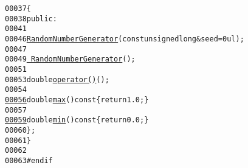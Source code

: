 \begin{footnotesize}
\begin{alltt}
00037     \{
00038         \textcolor{keyword}{public}:
00041 
00046             \hyperlink{classeos_1_1RandomNumberGenerator_a661f2b9c129ddd7a1c23f463ef4ec5b7}{RandomNumberGenerator}(\textcolor{keyword}{const} \textcolor{keywordtype}{unsigned} \textcolor{keywordtype}{long} & seed = 0ul);
00047 
00049             \hyperlink{classeos_1_1RandomNumberGenerator_a379d4e110cdf0ded2e930e2e7ffa59a1}{~RandomNumberGenerator}();
00051 
00053             \textcolor{keywordtype}{double} \hyperlink{classeos_1_1RandomNumberGenerator_ac81a62bb3e4534fcfb0d15195ee653b0}{operator() }();
00054 
\hypertarget{random__number__generator_8hh_source_l00056}{}\hyperlink{classeos_1_1RandomNumberGenerator_adac254d76323261e06d42b2f48e05c50}{00056}             \textcolor{keywordtype}{double} \hyperlink{classeos_1_1RandomNumberGenerator_adac254d76323261e06d42b2f48e05c50}{max}()\textcolor{keyword}{ const }\{ \textcolor{keywordflow}{return} 1.0; \}
00057 
\hypertarget{random__number__generator_8hh_source_l00059}{}\hyperlink{classeos_1_1RandomNumberGenerator_a2268a048896484b9d12d86fcfd7a6dbb}{00059}             \textcolor{keywordtype}{double} \hyperlink{classeos_1_1RandomNumberGenerator_a2268a048896484b9d12d86fcfd7a6dbb}{min}()\textcolor{keyword}{ const }\{ \textcolor{keywordflow}{return} 0.0; \}
00060     \};
00061 \}
00062 
00063 \textcolor{preprocessor}{#endif}
\end{alltt}\end{footnotesize}
